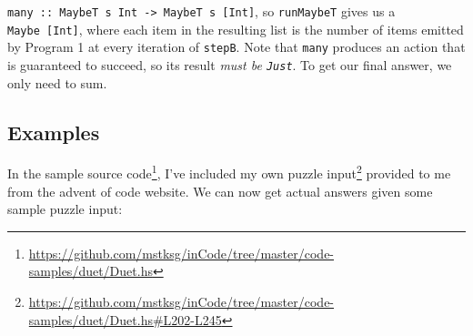 \documentclass[]{article}
\newenvironment{Shaded}{}{}
\newcommand{\CharTok}[1]{\textcolor[rgb]{0.25,0.44,0.63}{#1}}
\newcommand{\CommentTok}[1]{\textcolor[rgb]{0.38,0.63,0.69}{\textit{#1}}}
\newcommand{\DataTypeTok}[1]{\textcolor[rgb]{0.56,0.13,0.00}{#1}}
\newcommand{\DecValTok}[1]{\textcolor[rgb]{0.25,0.63,0.44}{#1}}
\newcommand{\FunctionTok}[1]{\textcolor[rgb]{0.02,0.16,0.49}{#1}}
\newcommand{\KeywordTok}[1]{\textcolor[rgb]{0.00,0.44,0.13}{\textbf{#1}}}
\newcommand{\NormalTok}[1]{#1}
\newcommand{\OtherTok}[1]{\textcolor[rgb]{0.00,0.44,0.13}{#1}}
\newcommand{\StringTok}[1]{\textcolor[rgb]{0.25,0.44,0.63}{#1}}
\renewcommand{\href}[2]{#2\footnote{\url{#1}}}
\begin{document}
\begin{Shaded}
\end{Shaded}

\texttt{many\ ::\ MaybeT\ s\ Int\ -\textgreater{}\ MaybeT\ s\ {[}Int{]}}, so
\texttt{runMaybeT} gives us a \texttt{Maybe\ {[}Int{]}}, where each item in the
resulting list is the number of items emitted by Program 1 at every iteration of
\texttt{stepB}. Note that \texttt{many} produces an action that is guaranteed to
succeed, so its result \emph{must be \texttt{Just}}. To get our final answer, we
only need to sum.

\hypertarget{examples}{%
\subsection{Examples}\label{examples}}

In the
\href{https://github.com/mstksg/inCode/tree/master/code-samples/duet/Duet.hs}{sample
source code}, I've included
\href{https://github.com/mstksg/inCode/tree/master/code-samples/duet/Duet.hs\#L202-L245}{my
own puzzle input} provided to me from the advent of code website. We can now get
actual answers given some sample puzzle input:

\begin{Shaded}
\end{Shaded}
\end{document}
